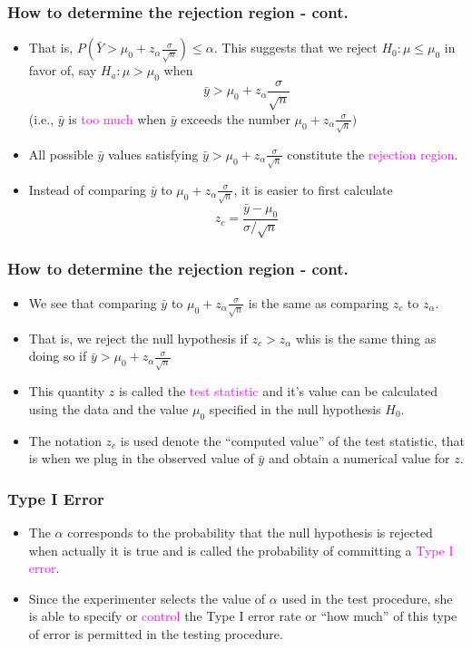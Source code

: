 \documentclass[xcolor=dvipsnames,12pt]{beamer}
\begin{document}
\begin{frame}
\frametitle{How to determine the rejection region - cont.}
\begin{itemize}
\item  That is, 
$P(\bar{Y} > \mu_0 + z_\alpha \frac{\sigma}{\sqrt{n}})\leq \alpha.$ 
This suggests that we reject  $H_0: \mu \leq \mu_0$
in favor of, say $H_a: \mu > \mu_0$ when
$$
\bar{y} > \mu_0 + z_\alpha \frac{\sigma}{\sqrt{n}}
$$
(i.e., $\bar{y}$ is \textcolor{magenta}{too much}  when $\bar{y}$ exceeds the number $\mu_0 +
 z_\alpha \frac{\sigma}{\sqrt{n}})$\\
\item All possible $\bar{y}$ values satisfying $\bar{y} > \mu_0 + z_\alpha
\frac{\sigma}{\sqrt{n}}$ constitute the \textcolor{magenta}{rejection} \textcolor{magenta}{region}. 

\item  Instead of comparing  $\bar{y}$ to $\mu_0 + z_\alpha
\frac{\sigma}{\sqrt{n}}$, it is easier to first calculate 
$$
  z_c=\frac{\bar{y}-\mu_0}{\sigma/\sqrt{n}} 
$$
\end{itemize}
\end{frame}


\begin{frame}
\frametitle{How to determine the rejection region - cont.}
\begin{itemize}
\item We see that comparing $\bar{y}$ to $ \mu_0 + z_\alpha \frac{\sigma}{\sqrt{n}}$ is the same as comparing $z_c$ to $z_\alpha$.

\item That is, we reject the null hypothesis if $z_c > z_\alpha$ whis is the same thing as doing so if
$\bar{y} > \mu_0 + z_\alpha \frac{\sigma}{\sqrt{n}}$

 \item This  quantity $z$ is called
the \textcolor{magenta}{test statistic} and it's value can be calculated using the data
and the value $\mu_0$ specified in the null hypothesis $H_0$.
\item The notation $z_c$  is used denote the ``computed value'' of the test statistic, that is when we plug in the observed value of $\bar{y}$ and obtain a numerical value for $z$.
\end{itemize}
\end{frame}


\begin{frame}
\frametitle{Type I Error}
\begin{itemize}
\item  The $\alpha$ corresponds to the probability that the null
hypothesis is rejected when actually it is true and is called
the probability of committing a \textcolor{magenta}{Type I error}. 
\item Since the experimenter selects the value of $\alpha$  used in the test
procedure, she is able to specify or \textcolor{magenta}{control} the Type I error
rate or ``how much'' of this type of error is permitted in the 
testing procedure.
\end{itemize}
\end{frame}
\end{document}
